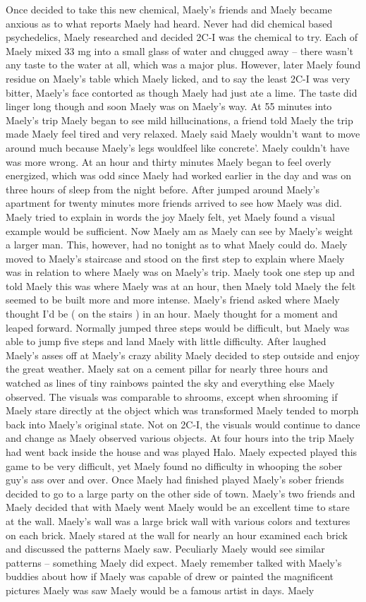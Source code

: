 \documentclass[12pt]{book}
\begin{document}
Once decided to take this new chemical, Maely's friends and Maely became anxious as to what reports Maely had heard. Never had did chemical based psychedelics, Maely researched and decided 2C-I was the chemical to try. Each of Maely mixed 33 mg into a small glass of water and chugged away -- there wasn't any taste to the water at all, which was a major plus. However, later Maely found residue on Maely's table which Maely licked, and to say the least 2C-I was very bitter, Maely's face contorted as though Maely had just ate a lime. The taste did linger long though and soon Maely was on Maely's way. At 55 minutes into Maely's trip Maely began to see mild hillucinations, a friend told Maely the trip made Maely feel tired and very relaxed. Maely said Maely wouldn't want to move around much because Maely's legs wouldfeel like concrete'. Maely couldn't have was more wrong. At an hour and thirty minutes Maely began to feel overly energized, which was odd since Maely had worked earlier in the day and was on three hours of sleep from the night before. After jumped around Maely's apartment for twenty minutes more friends arrived to see how Maely was did. Maely tried to explain in words the joy Maely felt, yet Maely found a visual example would be sufficient. Now Maely am as Maely can see by Maely's weight a larger man. This, however, had no  tonight as to what Maely could do. Maely moved to Maely's staircase and stood on the first step to explain where Maely was in relation to where Maely was on Maely's trip. Maely took one step up and told Maely this was where Maely was at an hour, then Maely told Maely the felt seemed to be built more and more intense. Maely's friend asked where Maely thought I'd be ( on the stairs ) in an hour. Maely thought for a moment and leaped forward. Normally jumped three steps would be difficult, but Maely was able to jump five steps and land Maely with little difficulty. After laughed Maely's asses off at Maely's crazy ability Maely decided to step outside and enjoy the great weather. Maely sat on a cement pillar for nearly three hours and watched as lines of tiny rainbows painted the sky and everything else Maely observed. The visuals was comparable to shrooms, except when shrooming if Maely stare directly at the object which was transformed Maely tended to morph back into Maely's original state. Not on 2C-I, the visuals would continue to dance and change as Maely observed various objects. At four hours into the trip Maely had went back inside the house and was played Halo. Maely expected played this game to be very difficult, yet Maely found no difficulty in whooping the sober guy's ass over and over. Once Maely had finished played Maely's sober friends decided to go to a large party on the other side of town. Maely's two friends and Maely decided that with Maely went Maely would be an excellent time to stare at the wall. Maely's wall was a large brick wall with various colors and textures on each brick. Maely stared at the wall for nearly an hour examined each brick and discussed the patterns Maely saw. Peculiarly Maely would see similar patterns -- something Maely did expect. Maely remember talked with Maely's buddies about how if Maely was capable of drew or painted the magnificent pictures Maely was saw Maely would be a famous artist in days. Maely 
\end{document}

